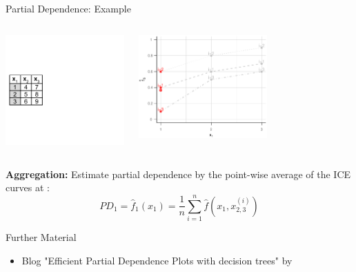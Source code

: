 \documentclass[aspectratio=169]{../latex_main/tntbeamer}  %
\begin{document}
\begin{frame}{Partial Dependence: Example}
\vspace{-3em}
\begin{columns}[T]

\begin{column}{0.3\textwidth}

\begin{center}
\includegraphics[page=10, width=\textwidth]{figure/ice_pd_plot_demo}
\end{center}

\end{column}
\begin{column}{0.7\textwidth}

\begin{center}
\includegraphics[page=3, width=0.6\textwidth]{figure/PD}
\end{center}
\end{column}

\end{columns}

\textbf{Aggregation:} Estimate partial dependence by the point-wise average of the ICE curves at :
$$PD_1 = \hat{f}_{1}(x_1) = \frac{1}{n} \sum_{i=1}^n \hat{f}(x_1, x_{2, 3}^{(i)})$$

\end{frame}

\begin{frame}[c]{Further Material}

\begin{itemize}
    \item Blog "Efficient Partial Dependence Plots with decision trees" by 
\end{itemize}

\end{frame}
\end{document}
